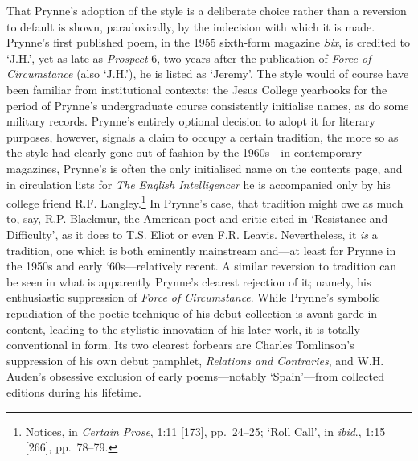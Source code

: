 \documentclass[]{article}
\begin{document}
\noindent That Prynne's adoption of the style is a deliberate choice
rather than a reversion to default is shown, paradoxically, by the
indecision with which it is made. Prynne's first published poem, in the
1955 sixth-form magazine \emph{Six}, is credited to `J.H.', yet as late
as \emph{Prospect} 6, two years after the publication of \emph{Force of
Circumstance} (also `J.H.'), he is listed as `Jeremy'. The style would
of course have been familiar from institutional contexts: the Jesus
College yearbooks for the period of Prynne's undergraduate course
consistently initialise names, as do some military records. Prynne's
entirely optional decision to adopt it for literary purposes, however,
signals a claim to occupy a certain tradition, the more so as the style
had clearly gone out of fashion by the 1960s---in contemporary
magazines, Prynne's is often the only initialised name on the contents
page, and in circulation lists for \emph{The English Intelligencer} he
is accompanied only by his college friend R.F. Langley.\footnote{Notices,
  in \emph{Certain Prose}, 1:11 {[}173{]}, pp.~24--25; `Roll Call', in
  \emph{ibid}., 1:15 {[}266{]}, pp.~78--79.} In Prynne's case, that
tradition might owe as much to, say, R.P. Blackmur, the American poet
and critic cited in `Resistance and Difficulty', as it does to T.S.
Eliot or even F.R. Leavis. Nevertheless, it \emph{is} a tradition, one
which is both eminently mainstream and---at least for Prynne in the
1950s and early `60s---relatively recent. A similar reversion to
tradition can be seen in what is apparently Prynne's clearest rejection
of it; namely, his enthusiastic suppression of \emph{Force of
Circumstance}. While Prynne's symbolic repudiation of the poetic
technique of his debut collection is avant-garde in content, leading to
the stylistic innovation of his later work, it is totally conventional
in form. Its two clearest forbears are Charles Tomlinson's suppression
of his own debut pamphlet, \emph{Relations and Contraries}, and W.H.
Auden's obsessive exclusion of early poems---notably `Spain'---from
collected editions during his lifetime.
\end{document}
